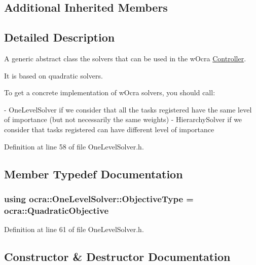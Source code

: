 \subsection*{Additional Inherited Members}


\subsection{Detailed Description}
A generic abstract class the solvers that can be used in the w\+Ocra \hyperlink{classocra_1_1Controller}{Controller}. 

It is based on quadratic solvers.

To get a concrete implementation of w\+Ocra solvers, you should call\+: \begin{DoxyVerb} - OneLevelSolver if we consider that all the tasks registered have the same level of importance (but not necessarily the same weights)
 - HierarchySolver if we consider that tasks registered can have different level of importance\end{DoxyVerb}
 

Definition at line 58 of file One\+Level\+Solver.\+h.



\subsection{Member Typedef Documentation}
\subsubsection[{\texorpdfstring{Objective\+Type}{ObjectiveType}}]{\setlength{\rightskip}{0pt plus 5cm}using {\bf ocra\+::\+One\+Level\+Solver\+::\+Objective\+Type} =  {\bf ocra\+::\+Quadratic\+Objective}}\hypertarget{classocra_1_1OneLevelSolver_a93b0be052a859bbd4c81584aa1646ffb}{}\label{classocra_1_1OneLevelSolver_a93b0be052a859bbd4c81584aa1646ffb}


Definition at line 61 of file One\+Level\+Solver.\+h.



\subsection{Constructor \& Destructor Documentation}
